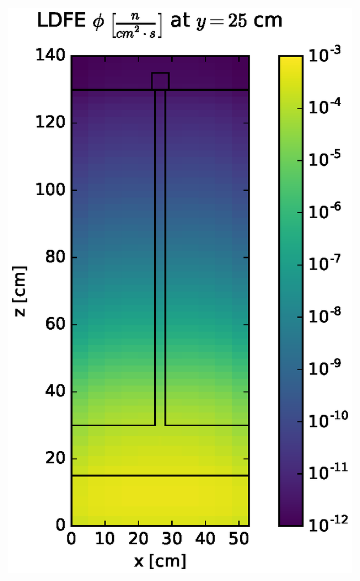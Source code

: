 \documentclass{article} %
\begin{document}
\begin{figure}[!htb]
\begin{subfigure}{0.4\textwidth}
\includegraphics[max height=0.445\textheight]
{img/steel-fwd-flux-ldfe01.eps}
\end{subfigure} ~
\begin{subfigure}{0.4\textwidth}

\end{subfigure}
\end{figure}
\end{document}
